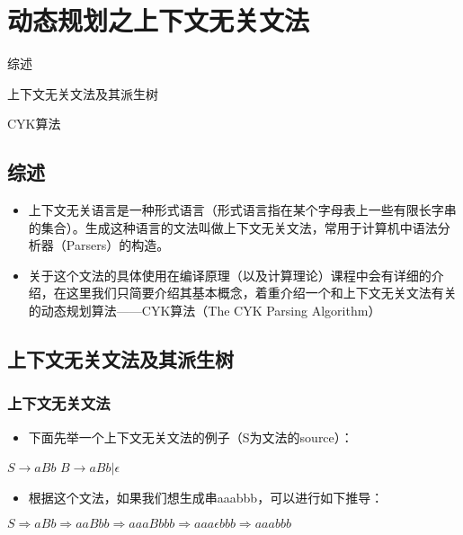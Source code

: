 \chapter{动态规划之上下文无关文法}\label{header-n1150}

\begin{introduction}
	\item 综述
	\item 上下文无关文法及其派生树
	\item CYK算法
\end{introduction}

\section{综述}\label{header-n1151}

\begin{itemize}
\item
  上下文无关语言是一种形式语言（形式语言指在某个字母表上一些有限长字串的集合）。生成这种语言的文法叫做上下文无关文法，常用于计算机中语法分析器（Parsers）的构造。
\item
  关于这个文法的具体使用在编译原理（以及计算理论）课程中会有详细的介绍，在这里我们只简要介绍其基本概念，着重介绍一个和上下文无关文法有关的动态规划算法------CYK算法（The
  CYK Parsing Algorithm）
\end{itemize}

\section{上下文无关文法及其派生树}\label{header-n1157}

\subsection{上下文无关文法}\label{header-n1158}

\begin{itemize}
\item
  下面先举一个上下文无关文法的例子（S为文法的source）：
\end{itemize}

\(S\rightarrow aBb\) \quad
\(B\rightarrow aBb|\epsilon\)

\begin{itemize}
\item
  根据这个文法，如果我们想生成串aaabbb，可以进行如下推导：
\end{itemize}

\(S\Rightarrow aBb \Rightarrow aaBbb \Rightarrow aaaBbbb \Rightarrow aaa\epsilon bbb \Rightarrow aaabbb\)

